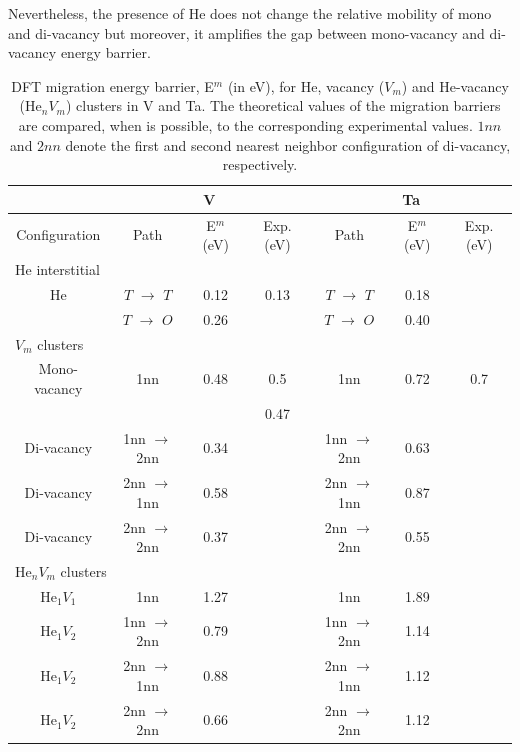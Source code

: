 \documentclass[a4,12pt,showpacs,preprintnumbers,amsmath,amssymb]{revtex4}
\begin{document}
Nevertheless, the presence of He does not change the relative mobility of mono and di-vacancy but moreover, 
it amplifies the gap between mono-vacancy and di-vacancy energy barrier.

\begin{table}
\centering
 \begin{tabular}{c|ccc|ccc}
 \hline
  & \multicolumn{3}{|c|}{V} & \multicolumn{3}{c}{Ta} \\
  \hline
  Configuration & Path & E$^m$ (eV) & Exp. (eV) & Path & E$^m$ (eV) & Exp. (eV) \\
  \hline
  \multicolumn{7}{l}{He interstitial} \\
  \hline
  He & $T$ $\rightarrow$ $T$ & 0.12 & 0.13 \cite{Fedorov1996} & $T$ $\rightarrow$ $T$ & 0.18 &\\
     & $T$ $\rightarrow$ $O$ & 0.26 & & $T$ $\rightarrow$ $O$ & 0.40 &\\
  \hline
  \multicolumn{7}{l}{$V_m$ clusters} \\
  \hline
  Mono-vacancy & 1nn & 0.48 & 0.5 \cite{Fedorov1996} \cite{ullmaier1991} & 1nn & 0.72 & 0.7 \cite{faber1974}\cite{ullmaier1991}\\
   & &  & 0.47 \cite{vanveen1994} & & & \\
  Di-vacancy & 1nn $\rightarrow$ 2nn & 0.34 & & 1nn $\rightarrow$ 2nn & 0.63 &\\
  Di-vacancy & 2nn $\rightarrow$ 1nn & 0.58 & & 2nn $\rightarrow$ 1nn & 0.87 &\\
  Di-vacancy & 2nn $\rightarrow$ 2nn & 0.37 & & 2nn $\rightarrow$ 2nn & 0.55 &\\
  \hline
  \multicolumn{7}{l}{He$_nV_m$ clusters} \\
  \hline
  He$_1V_1$ & 1nn & 1.27 & & 1nn & 1.89 &\\
  He$_1V_2$ & 1nn $\rightarrow$ 2nn & 0.79 & & 1nn $\rightarrow$ 2nn & 1.14 &\\
  He$_1V_2$ & 2nn $\rightarrow$ 1nn & 0.88 & & 2nn $\rightarrow$ 1nn & 1.12 &\\
  He$_1V_2$ & 2nn $\rightarrow$ 2nn & 0.66 & & 2nn $\rightarrow$ 2nn & 1.12 &\\
  \hline
 \end{tabular}
\caption{DFT migration energy barrier, E$^m$ (in eV),  for He, vacancy ($V_m$) and He-vacancy (He$_nV_m$) clusters in V and Ta. The theoretical values of the migration barriers are compared, when is possible, to the corresponding experimental values.  $1nn$ and $2nn$ denote the first and second nearest neighbor configuration of di-vacancy, respectively. 
\label{tab:em}}
\end{table}
\end{document}
